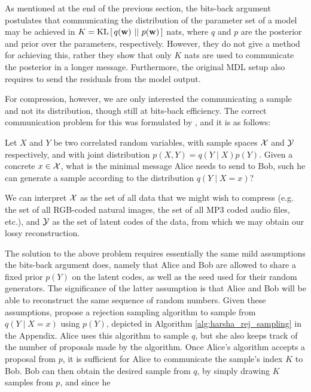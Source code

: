 \par
As mentioned at the end of the previous section, the bits-back argument
postulates that communicating the distribution of the parameter set of a model
may be achieved in $K = \mathrm{KL}\left[\,q(\mathbf{w})\,\,||\,\,p(\mathbf{w})\,\right]$ nats, where $q$ and $p$ are the
posterior and prior over the parameters, respectively. However, they do not give
a method for achieving this, rather they show that only $K$ nats are used to
communicate the posterior in a longer message. Furthermore, the original MDL setup
also requires to send the residuals from the model output.
\par
For compression, however, we are only interested the communicating a sample and
not its distribution, though still at bits-back efficiency. 
The correct communication problem for this was formulated by
\cite{harsha2007communication}, and it is as
follows:
\begin{framed}
Let $X$ and $Y$ be two correlated random variables, with sample spaces
$\mathcal{X}$ and $\mathcal{Y}$ respectively, and with joint distribution $p(X, Y) = q(Y \mid
X)p(Y)$. Given a concrete $x \in \mathcal{X}$, what is the minimal
message Alice needs to send to Bob, such he can generate a sample according to
the distribution $q(Y \mid X = x)$?
\end{framed}
\par 
We can interpret $\mathcal{X}$ as the set of all data that we might wish to compress
(e.g. the set of all RGB-coded natural images, the set of all MP3 coded audio
files, etc.), and $\mathcal{Y}$ as the set of latent codes of the data, from which we may
obtain our lossy reconstruction. 
\par
The solution to the above problem requires essentially the same mild assumptions
the bits-back argument does, namely that Alice and Bob are allowed to
share a fixed prior $p(Y)$ on the latent codes, as well as the seed used for
their random generators. The significance of the latter assumption is that Alice
and Bob will be able to reconstruct the same sequence of random numbers. Given
these assumptions, \cite{harsha2007communication} propose a rejection sampling
algorithm to sample from $q(Y \mid X = x)$ using $p(Y)$, depicted in Algorithm
\ref{alg:harsha_rej_sampling} in the Appendix. Alice uses this algorithm to
sample $q$, but she also keeps track of the number of proposals made by the
algorithm. Once Alice's algorithm accepts a proposal from $p$, it is sufficient
for Alice to communicate the sample's index $K$ to Bob. Bob can then obtain the
desired sample from $q$, by simply drawing $K$ samples from $p$, and since he
